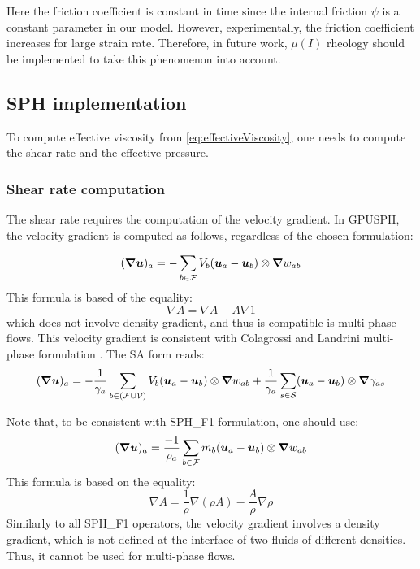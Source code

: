 \documentclass{../GPUSPHtemplate}
\begin{document}
Here the friction coefficient is constant in time since the internal friction $\psi$ is a constant parameter in our model. However, experimentally, the friction coefficient increases for large strain rate. Therefore, in future work, $\mu(I)$ rheology should be implemented to take this phenomenon into account.

\subsection{SPH implementation}
To compute effective viscosity from \eqref{eq:effectiveViscosity}, one needs to compute the shear rate and the effective pressure.
\subsubsection{Shear rate computation}
The shear rate requires the computation of the velocity gradient. In GPUSPH, the velocity gradient is computed as follows, regardless of the chosen formulation:

\begin{equation}
(\bm{\nabla} \bm{u})_a = - \sum\limits_{b\in{\mathcal{F}}} V_b (\bm{u}_a-\bm{u}_b) \otimes \bm{\nabla} w_{ab}
\end{equation}
This formula is based of the equality:
\begin{equation}
\nabla A = \nabla A - A \nabla 1
\end{equation}
which does not involve density gradient, and thus is compatible is multi-phase flows. This velocity gradient is consistent with Colagrossi and Landrini multi-phase formulation \citep{colagrossi2003numerical}.
%
The SA form reads:
\begin{equation}
(\bm{\nabla} \bm{u})_a = - \dfrac{1}{\gamma_a} \sum\limits_{b\in \left(\mathcal{F} \cup \mathcal{V} \right)} V_b (\bm{u}_a-\bm{u}_b) \otimes \bm{\nabla} w_{ab}
+ \dfrac{1}{\gamma_a} \sum\limits_{s\in \mathcal{S}} (\bm{u}_a-\bm{u}_b) \otimes \bm{\nabla} \gamma_{as}
\end{equation}

Note that, to be consistent with SPH\_F1 formulation, one should use:
\begin{equation}
(\bm{\nabla} \bm{u})_a = \dfrac{-1}{\rho_a} \sum\limits_{b\in{\mathcal{F}}} m_b (\bm{u}_a-\bm{u}_b) \otimes \bm{\nabla} w_{ab}
\end{equation}
%
This formula is based on the equality:
\begin{equation}
\nabla A = \frac{1}{\rho} \nabla \left( \rho A \right) - \dfrac{A}{\rho} \nabla \rho
\end{equation}
%
Similarly to all SPH\_F1 operators, the velocity gradient involves a density gradient, which is not defined at the interface of two fluids of different densities. Thus, it cannot be used for multi-phase flows.
\end{document}
